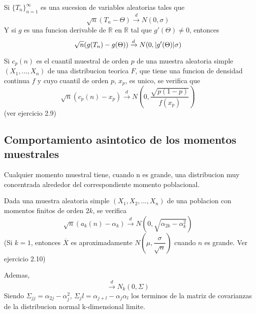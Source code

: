 \documentclass[10pt]{extarticle}
\newcommand{\R}{\mathbb{R}}
\newcommand{\<}{\langle}
\renewcommand{\>}{\rangle}
\theoremstyle{definition}
\begin{document}
\begin{lemma*}
  Si $\{T_n\}^\infty_{n=1}$ es una sucesion de variables aleatorias tales que
  \begin{equation*}
    \sqrt{n} (T_n-\Theta)\xrightarrow{d} N(0, \sigma)
  \end{equation*}
  Y si $g$ es una funcion derivable de $\R$ en $\R$ tal que $g'(\Theta)\neq 0$, entonces
  \begin{equation*}
    \sqrt{n}(g(T_n)-g(\Theta)) \xrightarrow{d} N(0, \abs{g'(\Theta)} \sigma)
  \end{equation*}
\end{lemma*}

\begin{theorem*}
  Si $c_p(n)$ es el cuantil muestral de orden $p$ de una muestra aleatoria simple $(X_1,...,X_n)$ de una distribucion teorica $F$, que tiene una funcion de densidad continua $f$ y cuyo cuantil de orden $p$, $x_p$, es unico, se verifica que
  \begin{equation*}
    \sqrt{n}(c_p(n) - x_p) \xrightarrow{d} N(0, \dfrac{\sqrt{p(1-p)}}{f(x_p)})
  \end{equation*}
  (ver ejercicio 2.9)
\end{theorem*}

\subsection*{Comportamiento asintotico de los momentos muestrales}

Cualquier momento muestral tiene, cuando n es grande, una distribucion muy concentrada alrededor del correspondiente momento poblacional.

\begin{theorem*}
  Dada una muestra aleatoria simple $(X_1, X_2, ..., X_n)$ de una poblacion con momentos finitos de orden $2k$, se verifica
  \begin{equation*}
    \sqrt{n}(a_k(n)-\alpha_k)\xrightarrow{d} N(0, \sqrt{\alpha_{2k}- \alpha_k^2})
  \end{equation*}
  (Si $k=1$, entonces $\overline{X}$ es aproximadamente $N(\mu, \dfrac{\sigma}{\sqrt{n}})$ cuando $n$ es grande. Ver ejercicio 2.10)

  Ademas,
  \begin{equation*}
    [\sqrt{n}(a_1(n)-\alpha_1),..., \sqrt{n}(a_k(n)-\alpha_k]\xrightarrow{d} N_k(0, \Sigma)
  \end{equation*}
  Siendo $\Sigma_{jj}=\alpha_{2j}-\alpha_j^2$, $\Sigma_jl=\alpha_{j+l}-\alpha_j\alpha_l$ los terminos de la matriz de covarianzas de la distribucion normal k-dimensional limite.
\end{theorem*}
\end{document}
